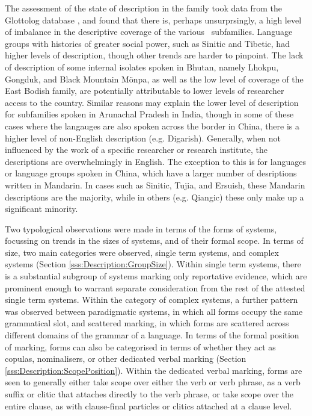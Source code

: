 The assessment of the state of description in the family took data from the Glottolog database \cite{glottolog}, and found that there is, perhaps unsurprsingly, a high level of imbalance in the descriptive coverage of the various \lfam\ subfamilies. Language groups with histories of greater social power, such as Sinitic and Tibetic, had higher levels of description, though other trends are harder to pinpoint. The lack of description of some internal isolates spoken in Bhutan, namely Lhokpu, Gongduk, and Black Mountain Mönpa, as well as the low level of coverage of the East Bodish family, are potentially attributable to lower levels of researcher access to the country. Similar reasons may explain the lower level of description for subfamilies spoken in Arunachal Pradesh in India, though in some of these cases where the langauges are also spoken across the border in China, there is a higher level of non-English description (e.g. Digarish). Generally, when not influenced by the work of a specific researcher or research institute, the descriptions are overwhelmingly in English. The exception to this is for languages or language groups spoken in China, which have a larger number of desriptions written in Mandarin. In cases such as Sinitic, Tujia, and Ersuish, these Mandarin descriptions are the majority, while in others (e.g. Qiangic) these only make up a significant minority.

Two typological observations were made in terms of the forms of systems, focussing on trends in the sizes of systems, and of their formal scope. In terms of size, two main categories were observed, single term systems, and complex systems (Section \ref{sss:Description:GroupSize}). Within single term systems, there is a substantial subgroup of systems marking only reportative evidence, which are prominent enough to warrant separate consideration from the rest of the attested single term systems. Within the category of complex systems, a further pattern was observed between paradigmatic systems, in which all forms occupy the same grammatical slot, and scattered marking, in which forms are scattered across different domains of the grammar of a language. In terms of the formal position of marking, forms can also be categorised in terms of whether they act as copulas, nominalisers, or other dedicated verbal marking (Section \ref{sss:Description:ScopePosition}). Within the dedicated verbal marking, forms are seen to generally either take scope over either the verb or verb phrase, as a verb suffix or clitic that attaches directly to the verb phrase, or take scope over the entire clause, as with clause-final particles or clitics attached at a clause level.

